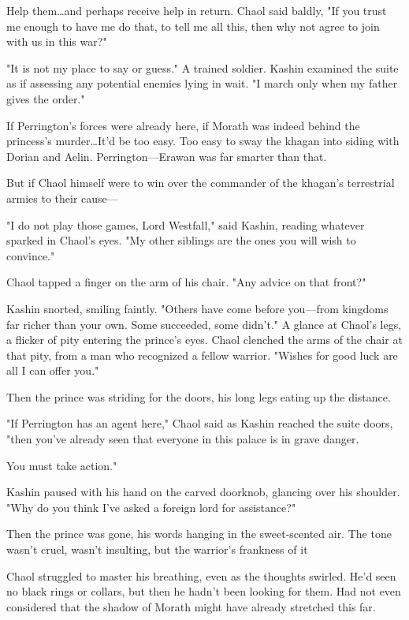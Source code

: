 Help them\ldots and perhaps receive help in return.
Chaol said baldly, "If you trust me enough to have me do that, to tell me all this, then why not agree to join with us in this war?"

"It is not my place to say or guess."
A trained soldier.
Kashin examined the suite as if assessing any potential enemies lying in wait.
"I march only when my father gives the order."

If Perrington's forces were already here, if Morath was indeed behind the princess's murder\ldots It'd be too easy.
Too easy to sway the khagan into siding with Dorian and Aelin.
Perrington---Erawan was far smarter than that.

But if Chaol himself were to win over the commander of the khagan's terrestrial armies to their cause---

"I do not play those games, Lord Westfall," said Kashin, reading whatever sparked in Chaol's eyes.
"My other siblings are the ones you will wish to convince."

Chaol tapped a finger on the arm of his chair.
"Any advice on that front?"

Kashin snorted, smiling faintly.
"Others have come before you---from kingdoms far richer than your own.
Some succeeded, some didn't."
A glance at Chaol's legs, a flicker of pity entering the prince's eyes.
Chaol clenched the arms of the chair at that pity, from a man who recognized a fellow warrior.
"Wishes for good luck are all I can offer you."

Then the prince was striding for the doors, his long legs eating up the distance.

"If Perrington has an agent here," Chaol said as Kashin reached the suite doors, "then you've already seen that everyone in this palace is in grave danger.

You must take action."

Kashin paused with his hand on the carved doorknob, glancing over his shoulder.
"Why do you think I've asked a foreign lord for assistance?"

Then the prince was gone, his words hanging in the sweet-scented air.
The tone wasn't cruel, wasn't insulting, but the warrior's frankness of it 

Chaol struggled to master his breathing, even as the thoughts swirled.
He'd seen no black rings or collars, but then he hadn't been looking for them.
Had not even considered that the shadow of Morath might have already stretched this far.

